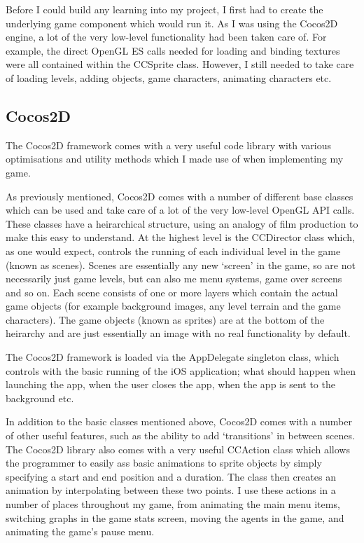 \documentclass[a4paper,oneside]{report}
\begin{document}
Before I could build any learning into my project, I first had to create the underlying game component which would run it. As I was using the Cocos2D engine, a lot of the very low-level functionality had been taken care of. For example, the direct OpenGL ES calls needed for loading and binding textures were all contained within the CCSprite class. However, I still needed to take care of loading levels, adding objects, game characters, animating characters etc.

\subsection{Cocos2D} 

The Cocos2D framework comes with a very useful code library with various optimisations and utility methods which I made use of when implementing my game.

As previously mentioned, Cocos2D comes with a number of different base classes which can be used and take care of a lot of the very low-level OpenGL API calls. These classes have a heirarchical structure, using an analogy of film production to make this easy to understand. At the highest level is the CCDirector class which, as one would expect, controls the running of each individual level in the game (known as scenes). Scenes are essentially any new `screen' in the game, so are not necessarily just game levels, but can also me menu systems, game over screens and so on. Each scene consists of one or more layers which contain the actual game objects (for example background images, any level terrain and the game characters). The game objects (known as sprites) are at the bottom of the heirarchy and are just essentially an image with no real functionality by default.

The Cocos2D framework is loaded via the AppDelegate singleton class, which controls with the basic running of the iOS application; what should happen when launching the app, when the user closes the app, when the app is sent to the background etc.

In addition to the basic classes mentioned above, Cocos2D comes with a number of other useful features, such as the ability to add `transitions' in between scenes. The Cocos2D library also comes with a very useful CCAction class which allows the programmer to easily ass basic animations to sprite objects by simply specifying a start and end position and a duration. The class then creates an animation by interpolating between these two points. I use these actions in a number of places throughout my game, from animating the main menu items, switching graphs in the game stats screen, moving the agents in the game, and animating the game's pause menu. 
\end{document}
